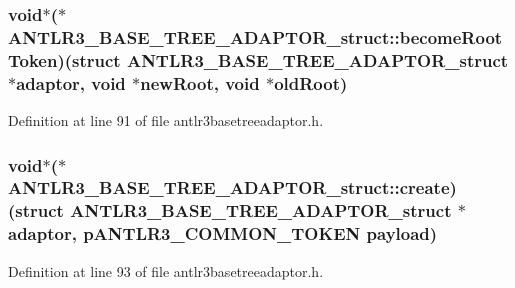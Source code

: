 \hypertarget{struct_a_n_t_l_r3___b_a_s_e___t_r_e_e___a_d_a_p_t_o_r__struct_a12c6658e21e36b77235aaeacbaf1c7fd}{
\subsubsection[{become\-Root\-Token}]{\setlength{\rightskip}{0pt plus 5cm}void$\ast$($\ast$ A\-N\-T\-L\-R3\-\_\-\-B\-A\-S\-E\-\_\-\-T\-R\-E\-E\-\_\-\-A\-D\-A\-P\-T\-O\-R\-\_\-struct\-::become\-Root\-Token)(struct {\bf A\-N\-T\-L\-R3\-\_\-\-B\-A\-S\-E\-\_\-\-T\-R\-E\-E\-\_\-\-A\-D\-A\-P\-T\-O\-R\-\_\-struct} $\ast$adaptor, void $\ast$new\-Root, void $\ast$old\-Root)}}\label{struct_a_n_t_l_r3___b_a_s_e___t_r_e_e___a_d_a_p_t_o_r__struct_a12c6658e21e36b77235aaeacbaf1c7fd}


Definition at line 91 of file antlr3basetreeadaptor.\-h.

\hypertarget{struct_a_n_t_l_r3___b_a_s_e___t_r_e_e___a_d_a_p_t_o_r__struct_a78bbafa130ea2650ef6d5d9825451209}{
\subsubsection[{create}]{\setlength{\rightskip}{0pt plus 5cm}void$\ast$($\ast$ A\-N\-T\-L\-R3\-\_\-\-B\-A\-S\-E\-\_\-\-T\-R\-E\-E\-\_\-\-A\-D\-A\-P\-T\-O\-R\-\_\-struct\-::create)(struct {\bf A\-N\-T\-L\-R3\-\_\-\-B\-A\-S\-E\-\_\-\-T\-R\-E\-E\-\_\-\-A\-D\-A\-P\-T\-O\-R\-\_\-struct} $\ast$adaptor, {\bf p\-A\-N\-T\-L\-R3\-\_\-\-C\-O\-M\-M\-O\-N\-\_\-\-T\-O\-K\-E\-N} payload)}}\label{struct_a_n_t_l_r3___b_a_s_e___t_r_e_e___a_d_a_p_t_o_r__struct_a78bbafa130ea2650ef6d5d9825451209}


Definition at line 93 of file antlr3basetreeadaptor.\-h.

